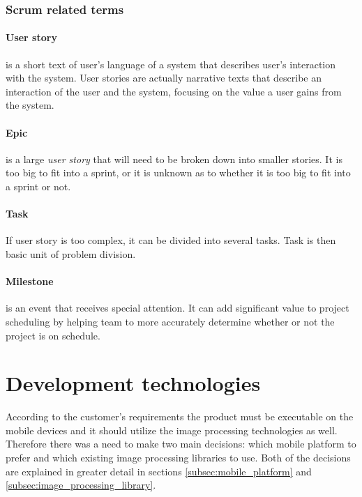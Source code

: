 \subsubsection{Scrum related terms}

\paragraph{User story}
is a short text of user's language of a system that describes user's interaction with the system. User stories are actually narrative texts that describe an interaction of the user and the system, focusing on the value a user gains from the system.

\paragraph{Epic}
is a large \emph{user story} that will need to be broken down into smaller stories. It is too big to fit into a sprint, or it is unknown as to whether it is too big to fit into a sprint or not.

\paragraph{Task}
If user story is too complex, it can be divided into several tasks. 
Task is then basic unit of problem division.

\paragraph{Milestone} is an event that receives special attention. It can add significant value to project scheduling by helping team to more accurately determine whether or not the project is on schedule.


\section{Development technologies} \label{sec:development_technologies}

According to the customer's requirements the product must be executable on the mobile devices and it should utilize the image processing technologies as well. 
Therefore there was a need to make two main decisions: which mobile platform to prefer and which existing image processing libraries to use. 
Both of the decisions are explained in greater detail in sections \ref{subsec:mobile_platform} and \ref{subsec:image_processing_library}.

